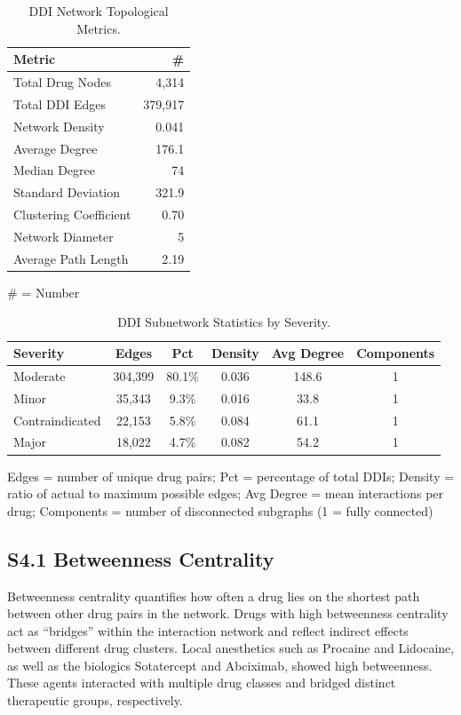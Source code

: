 \documentclass[12pt,a4paper]{article}
\begin{document}
\begin{table}[H]
\centering
\caption{DDI Network Topological Metrics.}
\label{tab:network_metrics}
\begin{tabular}{@{}lr@{}}
\toprule
\textbf{Metric} & \textbf{\#} \\
\midrule
Total Drug Nodes & 4,314 \\
Total DDI Edges & 379,917 \\
Network Density & 0.041 \\
Average Degree & 176.1 \\
Median Degree & 74 \\
Standard Deviation & 321.9 \\
Clustering Coefficient & 0.70 \\
Network Diameter & 5 \\
Average Path Length & 2.19 \\
\bottomrule
\end{tabular}
\end{table}

\noindent \# = Number

\begin{table}[H]
\centering
\caption{DDI Subnetwork Statistics by Severity.}
\label{tab:subnetwork_stats}
\begin{tabular}{@{}lccccc@{}}
\toprule
\textbf{Severity} & \textbf{Edges} & \textbf{Pct} & \textbf{Density} & \textbf{Avg Degree} & \textbf{Components} \\
\midrule
Moderate & 304,399 & 80.1\% & 0.036 & 148.6 & 1 \\
Minor & 35,343 & 9.3\% & 0.016 & 33.8 & 1 \\
Contraindicated & 22,153 & 5.8\% & 0.084 & 61.1 & 1 \\
Major & 18,022 & 4.7\% & 0.082 & 54.2 & 1 \\
\bottomrule
\end{tabular}
\end{table}

\noindent Edges = number of unique drug pairs; Pct = percentage of total DDIs; Density = ratio of actual to maximum possible edges; Avg Degree = mean interactions per drug; Components = number of disconnected subgraphs (1 = fully connected)

\subsection{S4.1 Betweenness Centrality}

Betweenness centrality quantifies how often a drug lies on the shortest path between other drug pairs in the network. Drugs with high betweenness centrality act as ``bridges'' within the interaction network and reflect indirect effects between different drug clusters. Local anesthetics such as Procaine and Lidocaine, as well as the biologics Sotatercept and Abciximab, showed high betweenness. These agents interacted with multiple drug classes and bridged distinct therapeutic groups, respectively.
\end{document}
